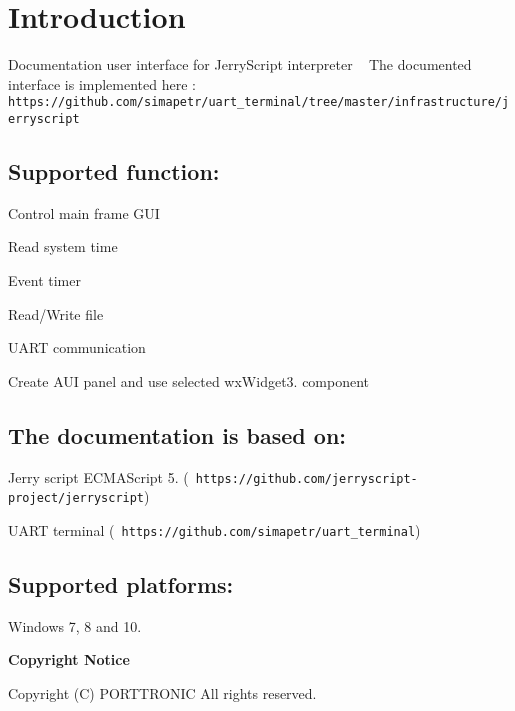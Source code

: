 \section*{{\bfseries{Introduction}}}

Documentation user interface for Jerry\+Script interpreter ~\newline
 The documented interface is implemented here \+:~\newline
 {\texttt{ https\+://github.\+com/simapetr/uart\+\_\+terminal/tree/master/infrastructure/jerryscript}}

\subsection*{Supported function\+:}


\begin{DoxyItemize}
\item Control main frame G\+UI
\item Read system time
\item Event timer
\item Read/\+Write file
\item U\+A\+RT communication
\item Create A\+UI panel and use selected wx\+Widget3. component
\end{DoxyItemize}

\subsection*{The documentation is based on\+:}


\begin{DoxyItemize}
\item Jerry script E\+C\+M\+A\+Script 5. ({\texttt{ https\+://github.\+com/jerryscript-\/project/jerryscript}})
\item U\+A\+RT terminal ({\texttt{ https\+://github.\+com/simapetr/uart\+\_\+terminal}})
\end{DoxyItemize}

\subsection*{Supported platforms\+:}


\begin{DoxyItemize}
\item Windows 7, 8 and 10.
\end{DoxyItemize}

{\bfseries{Copyright Notice}}

Copyright (C) P\+O\+R\+T\+T\+R\+O\+N\+IC All rights reserved. 